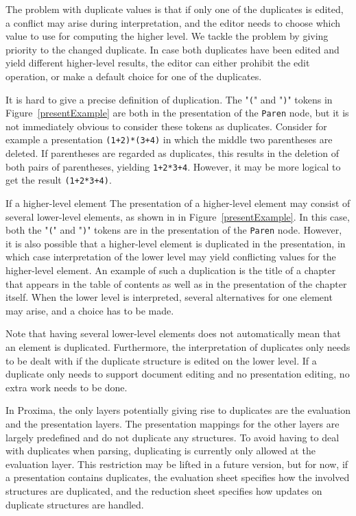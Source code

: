 The problem with duplicate values is that if only one of the duplicates is edited, a conflict may arise during interpretation, and the editor needs to choose which value to use for computing the higher level. We tackle the problem by giving priority to the changed duplicate. In case both duplicates have been edited and yield different higher-level results, the editor can either prohibit the edit operation, or make a default choice for one of the duplicates.

It is hard to give a precise definition of duplication. The "\verb|(|" and "\verb|)|" tokens in Figure~\ref{presentExample} are both in the presentation of the \verb|Paren| node, but it is not immediately obvious to consider these tokens as duplicates. Consider for example a presentation \verb|(1+2)*(3+4)| in which the middle two parentheses are deleted. If parentheses are regarded as duplicates, this results in the deletion of both pairs of parentheses, yielding \verb|1+2*3+4|. However, it may be more logical to get the result \verb|(1+2*3+4)|.


\bc
If a higher-level element The presentation of a higher-level element may consist of several lower-level elements, as shown in in Figure~\ref{presentExample}. In this case, both the "\verb|(|" and "\verb|)|" tokens are in the presentation of the \verb|Paren| node. However, it is also possible that a higher-level element is duplicated in the presentation, in which case interpretation of the lower level may yield conflicting values for the higher-level element. An example of such a duplication is the title of a chapter that appears in the table of contents as well as in the presentation of the chapter itself. When the lower level is interpreted, several alternatives for one element may arise, and a choice has to be made.

Note that having several lower-level elements does not automatically mean that an element is duplicated. Furthermore, the interpretation of duplicates only needs to be dealt with if the duplicate structure is edited on the lower level. If a duplicate only needs to support document editing and no presentation editing, no extra work needs to be done.
\ec

In Proxima, the only layers potentially giving rise to duplicates are the evaluation and the presentation layers. The presentation mappings for the other layers are largely predefined and do not duplicate any structures. 
\bc To avoid having to deal with duplicates when parsing, duplicating is currently only allowed at the evaluation layer. This restriction may be lifted in a future version, but for now, if a presentation contains duplicates, the evaluation sheet specifies how the involved structures are duplicated, and the reduction sheet specifies how updates on duplicate structures are handled.
\ec

